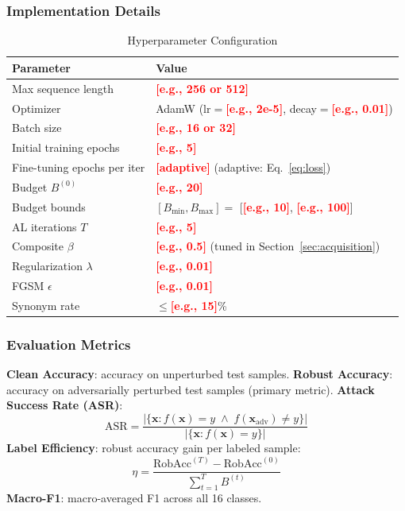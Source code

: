 \documentclass[review,1p,times,number]{elsarticle}
\newcommand{\TODO}[1]{\textcolor{red}{\textbf{[#1]}}}
\begin{document}
\subsubsection{Implementation Details}

\begin{table}[htbp]
\caption{Hyperparameter Configuration}
\label{tab:hyperparams}
\centering
\begin{tabular}{@{}ll@{}}
\toprule
\textbf{Parameter} & \textbf{Value} \\
\midrule
Max sequence length         & \TODO{e.g., 256 or 512} \\
Optimizer                   & AdamW ($\mathrm{lr}{=}$\TODO{e.g., 2e-5},
                              decay${=}$\TODO{e.g., 0.01}) \\
Batch size                  & \TODO{e.g., 16 or 32} \\
Initial training epochs     & \TODO{e.g., 5} \\
Fine-tuning epochs per iter & \TODO{adaptive} (adaptive: Eq.~\ref{eq:loss}) \\
Budget $B^{(0)}$            & \TODO{e.g., 20} \\
Budget bounds               & $[B_{\min}, B_{\max}] = $ [\TODO{e.g., 10}, \TODO{e.g., 100}] \\
AL iterations $T$           & \TODO{e.g., 5} \\
Composite $\beta$           & \TODO{e.g., 0.5} (tuned in Section~\ref{sec:acquisition}) \\
Regularization $\lambda$    & \TODO{e.g., 0.01} \\
FGSM $\epsilon$             & \TODO{e.g., 0.01} \\
Synonym rate                & $\leq$\TODO{e.g., 15}\% \\
\bottomrule
\end{tabular}
\end{table}

\subsubsection{Evaluation Metrics}

\textbf{Clean Accuracy}: accuracy on unperturbed test samples.
\textbf{Robust Accuracy}: accuracy on adversarially perturbed test
samples (primary metric).
\textbf{Attack Success Rate (ASR)}:
\begin{equation}
  \mathrm{ASR} = \frac{|\{\mathbf{x} : f(\mathbf{x}) {=} y \;\wedge\;
    f(\mathbf{x}_{\mathrm{adv}}) {\neq} y\}|}
    {|\{\mathbf{x} : f(\mathbf{x}) {=} y\}|}
  \label{eq:asr}
\end{equation}
\textbf{Label Efficiency}: robust accuracy gain per labeled sample:
\begin{equation}
  \eta = \frac{\mathrm{RobAcc}^{(T)} - \mathrm{RobAcc}^{(0)}}
              {\sum_{t=1}^{T} B^{(t)}}
  \label{eq:label_eff}
\end{equation}
\textbf{Macro-F1}: macro-averaged F1 across all 16 classes.
\end{document}
